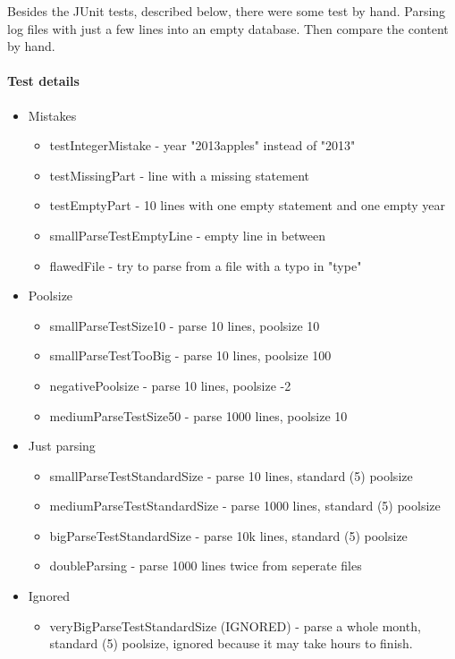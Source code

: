 Besides the JUnit tests, described below, there were some test by hand. Parsing log files with
just a few lines into an empty database. Then compare the content by hand.

\paragraph{Test details}
\begin{itemize}

\item Mistakes 
\begin{itemize}
\item testIntegerMistake - year "2013apples" instead of "2013"
\item testMissingPart - line with a missing statement
\item testEmptyPart - 10 lines with one empty statement and one empty year
\item smallParseTestEmptyLine - empty line in between
\item flawedFile - try to parse from a file with a typo in "type" 
\end{itemize}

\item Poolsize
\begin{itemize}
\item smallParseTestSize10 - parse 10 lines, poolsize 10
\item smallParseTestTooBig - parse 10 lines, poolsize 100 %
\item negativePoolsize - parse 10 lines, poolsize -2 %
\item mediumParseTestSize50 - parse 1000 lines, poolsize 10
\end{itemize}

\item Just parsing
\begin{itemize}
\item smallParseTestStandardSize - parse 10 lines, standard (5) poolsize
\item mediumParseTestStandardSize - parse 1000 lines, standard (5) poolsize
\item bigParseTestStandardSize - parse 10k lines, standard (5) poolsize
\item doubleParsing - parse 1000 lines twice from seperate files
\end{itemize}

\item Ignored
\begin{itemize}
\item veryBigParseTestStandardSize (IGNORED) - parse a whole month, standard (5) poolsize, ignored because it may take hours 
to finish.
\end{itemize}

\end{itemize}
